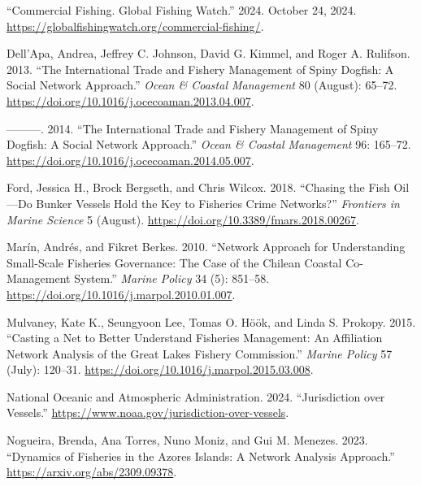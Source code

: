 \documentclass[
  letterpaper,
  DIV=11,
  numbers=noendperiod]{scrartcl}
\newlength{\cslhangindent}
\newenvironment{CSLReferences}[2] %
 {\begin{list}{}{%
  \setlength{\itemindent}{0pt}
  \setlength{\leftmargin}{0pt}
  \setlength{\parsep}{0pt}
  \ifodd #1
   \setlength{\leftmargin}{\cslhangindent}
   \setlength{\itemindent}{-1\cslhangindent}
  \fi
  \setlength{\itemsep}{#2\baselineskip}}}
 {\end{list}}
\begin{document}
\label{refs}
\begin{CSLReferences}{1}{0}
{``Commercial Fishing. Global Fishing Watch.''} 2024. October 24, 2024.
\url{https://globalfishingwatch.org/commercial-fishing/}.

Dell'Apa, Andrea, Jeffrey C. Johnson, David G. Kimmel, and Roger A.
Rulifson. 2013. {``The International Trade and Fishery Management of
Spiny Dogfish: A Social Network Approach.''} \emph{Ocean \& Coastal
Management} 80 (August): 65--72.
\url{https://doi.org/10.1016/j.ocecoaman.2013.04.007}.

---------. 2014. {``The International Trade and Fishery Management of
Spiny Dogfish: A Social Network Approach.''} \emph{Ocean \& Coastal
Management} 96: 165--72.
\url{https://doi.org/10.1016/j.ocecoaman.2014.05.007}.

Ford, Jessica H., Brock Bergseth, and Chris Wilcox. 2018. {``Chasing the
Fish Oil---Do Bunker Vessels Hold the Key to Fisheries Crime
Networks?''} \emph{Frontiers in Marine Science} 5 (August).
\url{https://doi.org/10.3389/fmars.2018.00267}.

Marín, Andrés, and Fikret Berkes. 2010. {``Network Approach for
Understanding Small-Scale Fisheries Governance: The Case of the Chilean
Coastal Co-Management System.''} \emph{Marine Policy} 34 (5): 851--58.
\url{https://doi.org/10.1016/j.marpol.2010.01.007}.

Mulvaney, Kate K., Seungyoon Lee, Tomas O. Höök, and Linda S. Prokopy.
2015. {``Casting a Net to Better Understand Fisheries Management: An
Affiliation Network Analysis of the Great Lakes Fishery Commission.''}
\emph{Marine Policy} 57 (July): 120--31.
\url{https://doi.org/10.1016/j.marpol.2015.03.008}.

National Oceanic and Atmospheric Administration. 2024. {``Jurisdiction
over Vessels.''} \url{https://www.noaa.gov/jurisdiction-over-vessels}.

Nogueira, Brenda, Ana Torres, Nuno Moniz, and Gui M. Menezes. 2023.
{``Dynamics of Fisheries in the Azores Islands: A Network Analysis
Approach.''} \url{https://arxiv.org/abs/2309.09378}.


\end{CSLReferences}
\end{document}
